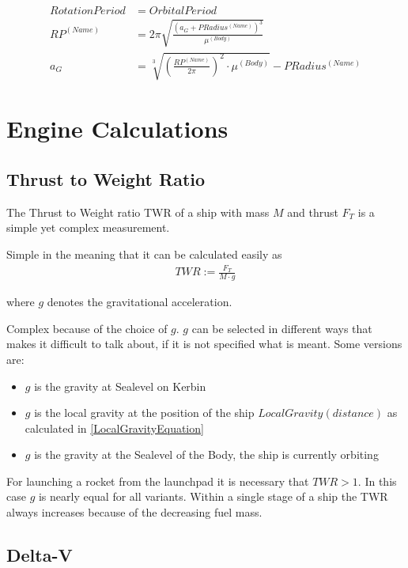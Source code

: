 \documentclass[11pt]{report}
\begin{document}
\begin{align}
  Rotation Period & = Orbital Period\nonumber\\
RP^{(Name)} & = 2\pi\sqrt{\frac{(a_G+PRadius^{(Name)})^3}{\mu^{(Body)}}}\nonumber\\
a_G & = \sqrt[3]{\left(\frac{RP^{(Name)}}{2\pi}\right)^2\cdot\mu^{(Body)}}-PRadius^{(Name)}
\end{align}

\chapter{Engine Calculations}

\section{Thrust to Weight Ratio}

The Thrust to Weight ratio  TWR
\cite{KspTwr} of a ship with mass $M$ and thrust $F_T$ is a simple yet
complex measurement.

Simple in the meaning that it can be calculated easily
as
\begin{align}
  TWR := \frac{F_T}{M\cdot g}
\end{align}

where $g$ denotes the gravitational acceleration.

Complex because of the choice of $g$. $g$ can be selected in different
ways that makes it difficult to talk about, if it is not specified
what is meant. Some versions are:

\begin{itemize}
\item $g$ is the gravity at Sealevel on Kerbin
\item $g$ is the local gravity at the position of the ship
  $LocalGravity(distance)$ as calculated in
  \eqref{LocalGravityEquation}
\item $g$ is the gravity at the Sealevel of the Body, the ship is
  currently orbiting
\end{itemize}

For launching a rocket from the launchpad it is necessary that $TWR >
1$. In this case $g$ is nearly equal for all variants. Within a single
stage of a ship the TWR always increases because of the decreasing
fuel mass.

\section{Delta-V}
\end{document}
